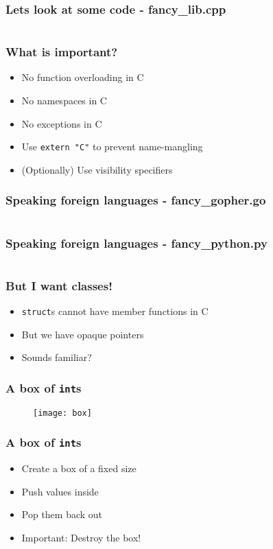 \begin{frame}[c]
  \frametitle{Lets look at some code - fancy\_lib.cpp}
  \inputminted[firstline=3]{cpp}{code/fancy2/fancy_lib.cpp}
\end{frame}

\begin{frame}[c]
  \frametitle{What is important?}\pause{}
  \begin{itemize}
    \item{No function overloading in C}\pause{}
    \item{No namespaces in C}\pause{}
    \item{No exceptions in C}\pause{}
    \item{Use \texttt{extern "C"} to prevent name-mangling}\pause{}
    \item{(Optionally) Use visibility specifiers}
  \end{itemize}
\end{frame}

\begin{frame}[c]
  \frametitle{Speaking foreign languages - fancy\_gopher.go}
  \inputminted[firstline=3,lastline=13]{go}{code/fancy2/fancy_gopher.go}
\end{frame}

\begin{frame}[c]
  \frametitle{Speaking foreign languages - fancy\_python.py}
  \inputminted[firstline=3,lastline=10]{python}{code/fancy2/fancy_python.py}
\end{frame}

\begin{frame}[c]
  \frametitle{But I want classes!}\pause{}
  \begin{itemize}
    \item{\texttt{struct}s cannot have member functions in C}\pause{}
    \item{But we have opaque pointers}\pause{}
    \item{Sounds familiar?}
  \end{itemize}
\end{frame}

\begin{frame}[c]
  \frametitle{A box of \texttt{int}s}
    \begin{figure}
      \centering
      \texttt{[image: box]}
    \end{figure}
\end{frame}

\begin{frame}[c]
  \frametitle{A box of \texttt{int}s}\pause{}
  \begin{itemize}
    \item{Create a box of a fixed size}\pause{}
    \item{Push values inside}\pause{}
    \item{Pop them back out}\pause{}
    \item{Important: Destroy the box!}
  \end{itemize}
\end{frame}


